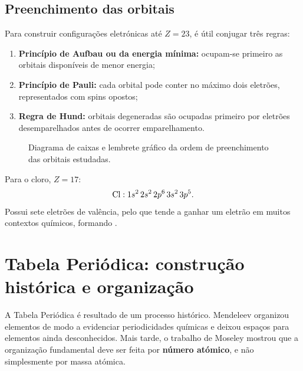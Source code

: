 \documentclass[11pt,a4paper,oneside]{book}
\begin{document}
\subsection*{Preenchimento das orbitais}
Para construir configurações eletrónicas até $Z=23$, é útil conjugar três regras:
\begin{enumerate}
  \item \textbf{Princípio de Aufbau ou da energia mínima:} ocupam-se primeiro as orbitais disponíveis de menor energia;
  \item \textbf{Princípio de Pauli:} cada orbital pode conter no máximo dois eletrões, representados com spins opostos;
  \item \textbf{Regra de Hund:} orbitais degeneradas são ocupadas primeiro por eletrões desemparelhados antes de ocorrer emparelhamento.
\end{enumerate}

\begin{figure}[H]
\centering
{}
\caption{Diagrama de caixas e lembrete gráfico da ordem de preenchimento das orbitais estudadas.}
\end{figure}

\begin{exemplo}[title=Exemplo resolvido -- configuração eletrónica]
Para o cloro, $Z=17$:
\[
\ce{Cl}: 1s^2\,2s^2\,2p^6\,3s^2\,3p^5.
\]
Possui sete eletrões de valência, pelo que tende a ganhar um eletrão em muitos contextos químicos, formando .
\end{exemplo}

\section{Tabela Periódica: construção histórica e organização}
A Tabela Periódica é resultado de um processo histórico. Mendeleev organizou elementos de modo a evidenciar periodicidades químicas e deixou espaços para elementos ainda desconhecidos. Mais tarde, o trabalho de Moseley mostrou que a organização fundamental deve ser feita por \textbf{número atómico}, e não simplesmente por massa atómica.
\end{document}

